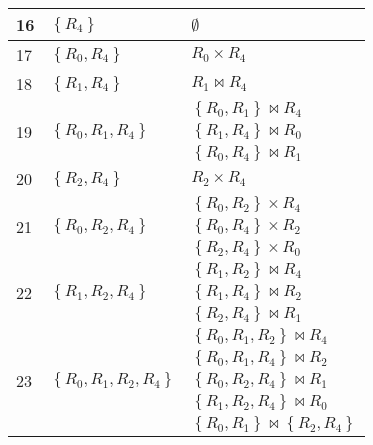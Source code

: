 \documentclass[12pt]{scrartcl}
\begin{document}
\begin{enumerate}
\begin{table}[H]
\begin{center}
\begin{tabular}{lll}
				16	&$\left\lbrace R_{4}\right\rbrace $	&$\emptyset$	\\ \hline
				17	&$\left\lbrace R_{0}, R_{4}\right\rbrace $	 & $R_{0} \times R_{4}$			\\ \hline
				18	&$\left\lbrace R_{1}, R_{4}\right\rbrace $	 & $R_{1} \bowtie R_{4}$			\\ \hline
				\multirow{3}{*}{19}	&\multirow{3}{*}{$\left\lbrace R_{0}, R_{1}, R_{4}\right\rbrace$}	& $\left\lbrace R_{0}, R_{1}\right\rbrace \bowtie R_{4}$\\
									&																	& $\left\lbrace R_{1}, R_{4}\right\rbrace \bowtie R_{0}$\\ 
									&																	& $\left\lbrace R_{0}, R_{4}\right\rbrace \bowtie R_{1}$\\\hline
				20 	&$\left\lbrace R_{2}, R_{4}\right\rbrace $	 & $R_{2} \times R_{4}$			\\ \hline
				\multirow{3}{*}{21}	&\multirow{3}{*}{$\left\lbrace R_{0}, R_{2}, R_{4}\right\rbrace$}	& $\left\lbrace R_{0}, R_{2}\right\rbrace \times R_{4}$ \\
									&																	& $\left\lbrace R_{0}, R_{4}\right\rbrace \times R_{2}$ \\
									&																	& $\left\lbrace R_{2}, R_{4}\right\rbrace \times R_{0}$ \\ \hline
				\multirow{3}{*}{22}	&\multirow{3}{*}{$\left\lbrace R_{1}, R_{2}, R_{4}\right\rbrace$}	& $\left\lbrace R_{1}, R_{2}\right\rbrace \bowtie R_{4}$ \\
									&																	& $\left\lbrace R_{1}, R_{4}\right\rbrace \bowtie R_{2}$ \\
									&																	& $\left\lbrace R_{2}, R_{4}\right\rbrace \bowtie R_{1}$ \\ \hline
				\multirow{7}{*}{23}	&\multirow{7}{*}{$\left\lbrace R_{0}, R_{1}, R_{2}, R_{4}\right\rbrace$}	& $\left\lbrace R_{0}, R_{1}, R_{2}\right\rbrace \bowtie R_{4}$ \\
									&																			& $\left\lbrace R_{0}, R_{1}, R_{4}\right\rbrace \bowtie R_{2}$ \\ 	
									&																			& $\left\lbrace R_{0}, R_{2}, R_{4}\right\rbrace \bowtie R_{1}$ \\
									&																			& $\left\lbrace R_{1}, R_{2}, R_{4}\right\rbrace \bowtie R_{0}$ \\
									&																			& $\left\lbrace R_{0}, R_{1}\right\rbrace \bowtie \left\lbrace R_{2}, R_{4}\right\rbrace $ \\ 

\end{tabular}
\end{center}
\end{table}
\end{enumerate}
\end{document}
